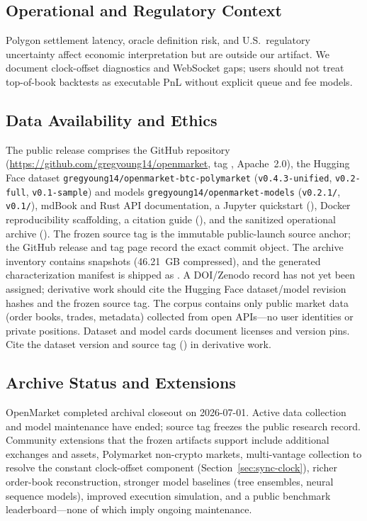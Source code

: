 \subsection{Operational and Regulatory Context}

Polygon settlement latency, oracle definition risk, and U.S.\ regulatory
uncertainty affect economic interpretation but are outside our artifact. We
document clock-offset diagnostics and WebSocket gaps; users should not treat
top-of-book backtests as executable PnL without explicit queue and fee models.

\subsection{Data Availability and Ethics}
\label{sec:release}

The public release comprises the GitHub repository
(\url{https://github.com/gregyoung14/openmarket}, tag \OpenMarketReleaseTag{},
Apache~2.0), the Hugging Face dataset
\texttt{gregyoung14/openmarket-btc-polymarket} (\texttt{v0.4.3-unified},
\texttt{v0.2-full}, \texttt{v0.1-sample}) and models
\texttt{gregyoung14/openmarket-models} (\texttt{v0.2.1/}, \texttt{v0.1/}),
mdBook and Rust API documentation, a Jupyter quickstart
(), Docker reproducibility scaffolding, a
citation guide (), and the sanitized operational archive
().
The frozen source tag \OpenMarketReleaseTag{} is the immutable public-launch
source anchor; the GitHub release and tag page record the exact commit object.
The archive inventory contains \OpenMarketSnapshots{} snapshots
(46.21~GB compressed), and the generated characterization manifest is shipped
as . A DOI/Zenodo record has not
yet been assigned; derivative work should cite the Hugging Face dataset/model
revision hashes and the frozen source tag.
The corpus contains only public market data (order books, trades,
metadata) collected from open APIs---no user identities or private positions.
Dataset and model cards document licenses and version pins. Cite the dataset
version and source tag (\OpenMarketReleaseTag{}) in derivative work.

\subsection{Archive Status and Extensions}
\label{sec:future-work}

OpenMarket completed archival closeout on 2026-07-01. Active data collection
and model maintenance have ended; source tag \OpenMarketReleaseTag{} freezes
the public research record. Community extensions that the frozen artifacts
support include additional exchanges and assets, Polymarket non-crypto
markets, multi-vantage collection to resolve the constant clock-offset
component (Section~\ref{sec:sync-clock}), richer order-book reconstruction,
stronger model baselines (tree ensembles, neural sequence models), improved
execution simulation, and a public benchmark leaderboard---none of which
imply ongoing maintenance.

